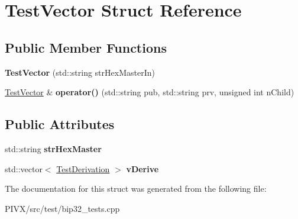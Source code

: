 \hypertarget{struct_test_vector}{}\section{Test\+Vector Struct Reference}
\label{struct_test_vector}
\subsection*{Public Member Functions}
\begin{DoxyCompactItemize}
\item 
\mbox{\label{struct_test_vector_a8df968a52aeec4bb196f25df26149880}} 
{\bfseries Test\+Vector} (std\+::string str\+Hex\+Master\+In)
\item 
\mbox{\label{struct_test_vector_a1542d97f320ee7e20df20ae892ca96be}} 
\mbox{\hyperlink{struct_test_vector}{Test\+Vector}} \& {\bfseries operator()} (std\+::string pub, std\+::string prv, unsigned int n\+Child)
\end{DoxyCompactItemize}
\subsection*{Public Attributes}
\begin{DoxyCompactItemize}
\item 
\mbox{\label{struct_test_vector_ae502ac11e16c7043c21010744629ae8a}} 
std\+::string {\bfseries str\+Hex\+Master}
\item 
\mbox{\label{struct_test_vector_ae64e3057c473c2e09536be8efc2d8cdf}} 
std\+::vector$<$ \mbox{\hyperlink{struct_test_derivation}{Test\+Derivation}} $>$ {\bfseries v\+Derive}
\end{DoxyCompactItemize}


The documentation for this struct was generated from the following file\+:\begin{DoxyCompactItemize}
\item 
P\+I\+V\+X/src/test/bip32\+\_\+tests.\+cpp\end{DoxyCompactItemize}
